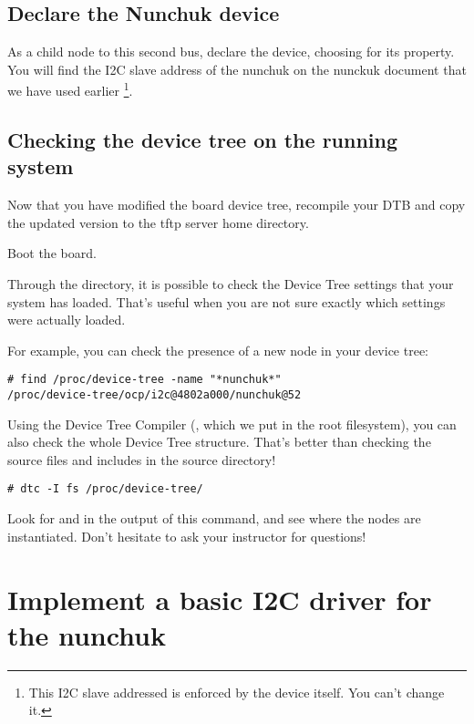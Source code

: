 \subsection{Declare the Nunchuk device} 

As a child node to this second bus, declare the 
device, choosing  for its 
property. You will find the I2C slave address of the nunchuk on the
nunckuk document that we have used earlier \footnote{This I2C slave
addressed is enforced by the device itself. You can't change it.}.

\subsection{Checking the device tree on the running system}

Now that you have modified the board device tree, recompile your
DTB and copy the updated version to the tftp server home directory.

Boot the board.

Through the  directory, it is possible to check
the Device Tree settings that your system has loaded. That's useful when
you are not sure exactly which settings were actually loaded. 

For example, you can check the presence of a new  node in
your device tree:

\begin{verbatim}
# find /proc/device-tree -name "*nunchuk*"
/proc/device-tree/ocp/i2c@4802a000/nunchuk@52
\end{verbatim}

Using the Device Tree Compiler (, which we put in the root
filesystem), you can also check the whole Device Tree structure. That's
better than checking the source files and includes in the source
directory!

\begin{verbatim}
# dtc -I fs /proc/device-tree/
\end{verbatim}

Look for  and  in the output of this command,
and see where the nodes are instantiated. Don't hesitate to ask your
instructor for questions!

\section{Implement a basic I2C driver for the nunchuk}

